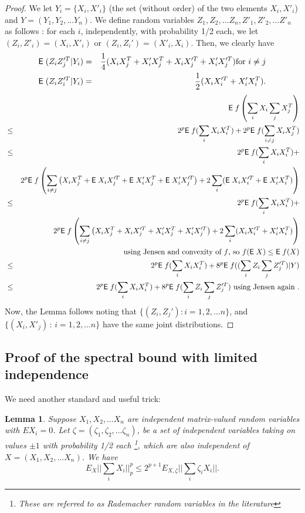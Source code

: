 \documentclass{book}
\newtheorem{lemma}[theorem]{Lemma}
\numberwithin{exercise}{chapter}
\begin{document}
{\begin{proof}
We let $Y_i=\{ X_i,X'_i\}$ (the set (without order) of the two elements $X_i,X'_i$) and
$Y=(Y_1,Y_2,\ldots Y_n)$. We define
random variables $Z_1,Z_2,\ldots Z_n,Z'_1,Z'_2,\ldots Z'_n$ as follows : for each $i$, independently,
with probability 1/2 each, we let $(Z_i,Z'_i)=(X_i,X'_i)$ or $(Z_i,Z_i')=(X'_i,X_i)$. Then, we clearly
have
\begin{eqnarray*}
\hbox{{\sf E}\;} (Z_iZ^{\prime T}_j|Y_i)
&=&{1\over 4} (X_iX_j^T+X'_iX_j^T+X_iX_j^{\prime T}+X'_iX^{\prime T}_j)\hbox{for } i\not= j\\
\hbox{{\sf E}\;} (Z_iZ^{\prime T}_i|Y_i)&=& {1\over 2} (X_iX^{\prime T}_i+ X'_iX_i^T).
\end{eqnarray*}
\begin{eqnarray*}
&&\E f\left(\sum_iX_i\sum_jX_j^T\right) \\
&\leq&
2^p\E f(\sum_iX_iX_i^T)+2^p \E f(\sum_{i\not=j}X_iX_j^T) \\
&\leq&
2^p\E f(\sum_iX_iX_i^T)+\\
&&2^p\E f\left(\sum_{i\not=j}\left( X_iX_j^T + \E X_iX_j^{\prime
T}+\E X'_iX_j^T
 + \E X'_iX^{\prime T}_j\right)
+2\sum_{i}(\E X_iX_i^{\prime T}+\E X_i'X_i^T)\right)\\
&\leq& 2^p\E f(\sum_iX_iX_i^T)+\\
&&2^p\E f\left(\sum_{i\not=j}\left(
X_iX_j^T + X_iX_j^{\prime T}+X'_iX_j^T
 + X'_iX_j^{\prime T}
 \right) +2\sum_{i}(X_iX_i^{\prime T}+X_i'X_i^T)\right)\\
&&\hfill \hbox{    using Jensen and convexity of $f$, so $f(\E X)\leq \E f(X)$}\\
&\leq& 2^{p}\E f(\sum_iX_iX_i^T)+8^{p}\E f((\sum_iZ_i\sum_jZ_j^{\prime T})|Y)\\
&\leq& 2^{p}\E f(\sum_iX_iX_i^T)+8^{p}\E f(\sum_iZ_i\sum_jZ_j^{\prime T})\hbox{    using Jensen again }.
\end{eqnarray*}
Now, the Lemma follows noting that $\{ (Z_i,Z_j'):i=1,2,\ldots n\}$,
and $\{ (X_i,X'_j)\, : \, i=1,2,\ldots n\}$ have
the same joint distributions.
\end{proof}

\subsection{Proof of the spectral bound with limited independence}

We need another standard and useful trick:

\begin{lemma}\label{rademacher}
Suppose $X_1,X_2,\ldots X_n$ are independent matrix-valued random
variables with $EX_i=0$. Let $\zeta=(\zeta_1,\zeta_2,\ldots
\zeta_n)$, be a set of independent variables taking on values $\pm
1$ with probability 1/2 each \footnote{These are referred to as
Rademacher random variables in the literature}, which are also
independent of $X=(X_1,X_2,\ldots X_n)$. We have
$$E_X||\sum_i X_i||_p^p\leq 2^{p+1}E_{X,\zeta }||\sum_i \zeta_i X_i||.$$
\end{lemma}

}
\end{document}
